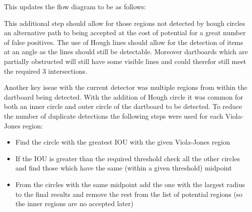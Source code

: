 \documentclass{article}
\begin{document}
\begin{multicols}{2}
This updates the flow diagram to be as follows:


This additional step should allow for those regions not detected by hough
circles an alternative path to being accepted at the cost of potential for a
great number of false positives. The use of Hough lines should allow for the
detection of items at an angle as the lines should still be detectable. Moreover
dartboards which are partially obstructed will still have some visible lines and could therefor still meet the required 3 intersections.

Another key issue with the current detector was multiple regions from within the dartboard being detected. With the addition of Hough circle it was common for both an inner circle and outer circle of the dartboard to be detected. To reduce the number of duplicate detections the following steps were used for each Viola-Jones region:

\begin{itemize}
  \item Find the circle with the greatest IOU with the given Viola-Jones region
  \item If the IOU is greater than the required threshold check all the other circles and find those which have the same (within a given threshold) midpoint
  \item From the circles with the same midpoint add the one with the largest radius to the final results and remove the rest from the list of potential regions (so the inner regions are no accepted later)
\end{itemize}


\end{multicols}
\end{document}
